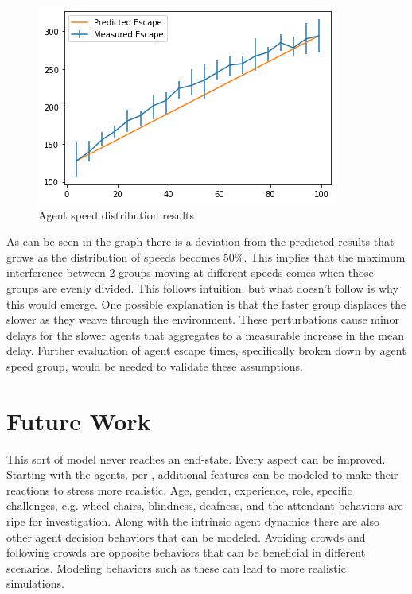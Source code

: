 \documentclass[12pt,letterpaper]{article}
\begin{document}
\begin{figure} [H]
  \centering
  \includegraphics[width=.75\linewidth]{./figures/speed_dist_test.png}
  \caption{Agent speed distribution results}
  \label{fig:speedResults}
\end{figure}

As can be seen in the graph there is a deviation from the predicted results that grows as the distribution of speeds becomes 50\%.  This implies that the maximum interference between 2 groups moving at different speeds comes when those groups are evenly divided.  This follows intuition, but what doesn't follow is why this would emerge.  One possible explanation is that the faster group displaces the slower as they weave through the environment.  These perturbations cause minor delays for the slower agents that aggregates to a measurable increase in the mean delay.  Further evaluation of agent escape times, specifically broken down by agent speed group, would be needed to validate these assumptions.


  
\section{Future Work}
This sort of model never reaches an end-state. Every aspect can be improved.  Starting with the agents, per \cite{almeidaCrowdSimulationModeling2013}, additional features can be modeled to make their reactions to stress more realistic. Age, gender, experience, role, specific challenges, e.g. wheel chairs, blindness, deafness, and the attendant behaviors are ripe for investigation.  Along with the intrinsic agent dynamics there are also other agent decision behaviors that can be modeled.  Avoiding crowds and following crowds are opposite behaviors that can be beneficial in different scenarios.  Modeling behaviors such as these can lead to more realistic simulations.
\end{document}
